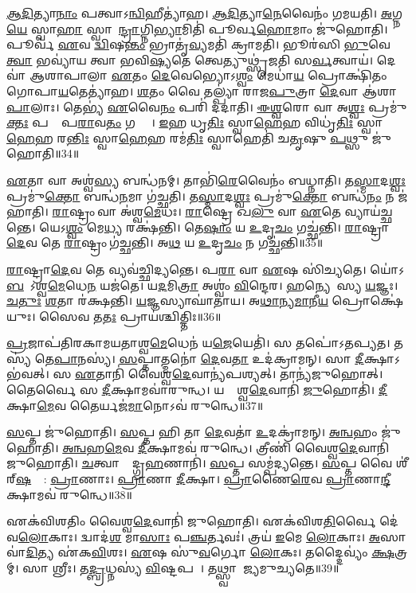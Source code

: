 \ul{𑌆}\ul{𑌦𑌿}𑌤𑍍𑌯𑌾\ul{𑌨𑌾𑌂} 𑌪𑌤𑍍𑌵𑌾\-𑌽\ul{𑌨𑍍𑌵𑌿}𑌹𑍀𑌤𑍍𑌯𑌾॑𑌹।
\ul{𑌆}\ul{𑌦𑌿}𑌤𑍍𑌯𑌾\ul{𑌨𑍇}𑌵𑍈𑌨𑌂॑ 𑌗𑌮𑌯𑌤𑌿।
\ul{𑌅}𑌗𑍍𑌨\ul{𑌯𑍇} 𑌸𑍍𑌵𑌾\ul{𑌹𑌾} 𑌸𑍍𑌵𑌾𑌹𑍇᳚\ul{𑌨𑍍𑌦𑍍𑌰𑌾}𑌗𑍍𑌨𑌿\ul{𑌭𑍍𑌯𑌾}𑌮𑌿𑌤𑌿॑ 𑌪𑍂𑌰𑍍𑌵\ul{𑌹𑍋}𑌮𑌾𑌂 𑌜𑍁॑𑌹𑍋𑌤𑌿।
𑌪𑍂𑌰𑍍𑌵॑ \ul{𑌏}𑌵 \ul{𑌦𑍍𑌵𑌿}𑌷\ul{𑌨𑍍𑌤𑌂} 𑌭𑍍𑌰𑌾𑌤𑍃॑\ul{𑌵𑍍𑌯}𑌮𑌤𑌿॑ 𑌕𑍍𑌰𑌾𑌮𑌤𑌿।
𑌭𑍂𑌰॑𑌸𑌿 \ul{𑌭𑍁}𑌵𑍇 \ul{𑌤𑍍𑌵𑌾} 𑌭𑌵𑍍𑌯𑌾॑𑌯 𑌤𑍍𑌵𑌾 𑌭𑌵𑌿\ul{𑌷𑍍𑌯}𑌤𑍇 𑌤𑍍𑌵𑍇𑌤𑍍𑌯𑍁𑌥𑍍𑌸𑍃॑𑌜𑌤𑌿 𑌸\ul{𑌰𑍍𑌵}𑌤𑍍𑌵𑌾𑌯॑।
𑌦𑍇𑌵𑌾॑ 𑌆𑌶𑌾𑌪𑌾𑌲𑌾 \ul{𑌏}𑌤𑌂 \ul{𑌦𑍇}𑌵𑍇𑌭𑍍𑌯𑍋\-𑌽\ul{𑌶𑍍𑌵𑌂} 𑌮𑍇𑌧𑌾॑\ul{𑌯} 𑌪𑍍𑌰𑍋𑌕𑍍𑌷𑌿॑𑌤𑌂 𑌗𑍋𑌪𑌾\ul{𑌯}𑌤𑍇𑌤𑍍𑌯𑌾॑𑌹।
\ul{𑌶}𑌤𑌂 𑌵𑍈 𑌤𑌲𑍍𑌪𑍍𑌯𑌾॑ 𑌰𑌾𑌜\ul{𑌪𑍁}𑌤𑍍𑌰𑌾 \ul{𑌦𑍇}𑌵𑌾 𑌆॑𑌶𑌾\ul{𑌪𑌾}𑌲𑌾𑌃।
𑌤𑍇𑌭𑍍𑌯॑ \ul{𑌏}𑌵𑍈\ul{𑌨𑌂} 𑌪𑌰𑌿॑ 𑌦𑌦𑌾𑌤𑌿।
\ul{𑌈}\ul{𑌶𑍍𑌵}𑌰𑍋 𑌵𑌾 𑌅\ul{𑌶𑍍𑌵𑌃} 𑌪𑍍𑌰𑌮𑍁॑\ul{𑌕𑍍𑌤𑌃} 𑌪𑌰𑌾𑌂᳚ 𑌪\ul{𑌰𑌾}𑌵\ul{𑌤𑌂} 𑌗𑌨𑍍𑌤𑍋𑌃᳚।
\ul{𑌇}𑌹 𑌧𑍃\ul{𑌤𑌿𑌃} 𑌸𑍍𑌵𑌾\ul{𑌹𑍇}𑌹 𑌵𑌿𑌧𑍃॑\ul{𑌤𑌿𑌃} 𑌸𑍍𑌵𑌾\ul{𑌹𑍇}𑌹 𑌰\ul{𑌨𑍍𑌤𑌿𑌃} 𑌸𑍍𑌵𑌾\ul{𑌹𑍇}𑌹 𑌰𑌮॑\ul{𑌤𑌿𑌃} 𑌸𑍍𑌵𑌾𑌹𑍇𑌤𑌿॑ 𑌚\ul{𑌤𑍃}𑌷𑍁 \ul{𑌪}𑌥𑍍𑌸𑍁 𑌜𑍁॑𑌹𑍋𑌤𑌿॥34॥

\ul{𑌏}𑌤𑌾 𑌵𑌾 𑌅𑌶𑍍𑌵॑\ul{𑌸𑍍𑌯} 𑌬𑌨𑍍𑌧॑𑌨𑌮𑍍।
𑌤𑌾𑌭𑌿॑\ul{𑌰𑍇}𑌵𑍈𑌨𑌂॑ 𑌬𑌧𑍍𑌨𑌾𑌤𑌿।
𑌤\ul{𑌸𑍍𑌮𑌾}𑌦\ul{𑌶𑍍𑌵𑌃} 𑌪𑍍𑌰𑌮𑍁॑\ul{𑌕𑍍𑌤𑍋} 𑌬𑌨𑍍𑌧॑\ul{𑌨}𑌮𑌾 𑌗॑𑌚𑍍𑌛𑌤𑌿।
𑌤\ul{𑌸𑍍𑌮𑌾}𑌦\ul{𑌶𑍍𑌵𑌃} 𑌪𑍍𑌰𑌮𑍁॑\ul{𑌕𑍍𑌤𑍋} 𑌬𑌨𑍍𑌧॑\ul{𑌨𑌂} 𑌨 𑌜॑𑌹𑌾𑌤𑌿।
\ul{𑌰𑌾}𑌷𑍍𑌟𑍍𑌰𑌂 𑌵𑌾 𑌅॑𑌶𑍍𑌵\ul{𑌮𑍇}𑌧𑌃।
\ul{𑌰𑌾}𑌷𑍍𑌟𑍍𑌰𑍇 𑌖\ul{𑌲𑍁} 𑌵𑌾 \ul{𑌏}𑌤𑍇 𑌵𑍍𑌯𑌾𑌯॑𑌚𑍍𑌛𑌨𑍍𑌤𑍇।
𑌯𑍇𑌽\ul{𑌶𑍍𑌵𑌂} 𑌮𑍇\ul{𑌧𑍍𑌯}\ul{} 𑌰𑌕𑍍𑌷॑𑌨𑍍𑌤𑌿।
𑌤𑍇\ul{𑌷𑌾𑌂} 𑌯 \ul{𑌉}𑌦𑍃\ul{𑌚𑌂} 𑌗𑌚𑍍𑌛॑𑌨𑍍𑌤𑌿।
\ul{𑌰𑌾}𑌷𑍍𑌟𑍍𑌰𑌾\ul{𑌦𑍇}𑌵 𑌤𑍇 \ul{𑌰𑌾}𑌷𑍍𑌟𑍍𑌰𑌂 𑌗॑𑌚𑍍𑌛𑌨𑍍𑌤𑌿।
𑌅\ul{𑌥} 𑌯 \ul{𑌉}𑌦𑍃\ul{𑌚𑌂} 𑌨 𑌗𑌚𑍍𑌛॑𑌨𑍍𑌤𑌿॥35॥

\ul{𑌰𑌾}𑌷𑍍𑌟𑍍𑌰𑌾\ul{𑌦𑍇}𑌵 𑌤𑍇 𑌵𑍍𑌯𑌵॑𑌚𑍍𑌛𑌿𑌦𑍍𑌯𑌨𑍍𑌤𑍇।
𑌪\ul{𑌰𑌾} 𑌵𑌾 \ul{𑌏}𑌷 𑌸𑌿॑𑌚𑍍𑌯𑌤𑍇।
𑌯𑍋॑𑌽\ul{𑌬}𑌲𑍋᳚\-𑌽𑌶𑍍𑌵\ul{𑌮𑍇}𑌧𑍇\ul{𑌨} 𑌯𑌜॑𑌤𑍇।
𑌯\ul{𑌦}𑌮𑌿\ul{𑌤𑍍𑌰𑌾} 𑌅𑌶𑍍𑌵𑌂॑ \ul{𑌵𑌿}𑌨𑍍𑌦𑍇𑌰\sn{}।
\ul{𑌹}𑌨𑍍𑌯𑍇𑌤𑌾᳚𑌸𑍍𑌯 \ul{𑌯}𑌜𑍍𑌞𑌃।
\ul{𑌚}\ul{𑌤𑍁𑌃} \ul{𑌶}𑌤𑌾 𑌰॑𑌕𑍍𑌷𑌨𑍍𑌤𑌿।
\ul{𑌯}𑌜𑍍𑌞𑌸𑍍𑌯𑌾𑌘𑌾॑𑌤𑌾𑌯।
𑌅\ul{𑌥𑌾}𑌨𑍍𑌯\ul{𑌮𑌾}𑌨𑍀\ul{𑌯} 𑌪𑍍𑌰𑍋𑌕𑍍𑌷𑍇॑𑌯𑍁𑌃।
𑌸𑍈𑌵 𑌤\ul{𑌤𑌃} 𑌪𑍍𑌰𑌾𑌯॑𑌶𑍍𑌚𑌿𑌤𑍍𑌤𑌿𑌃॥36॥\anuvakamend[\ul{𑌗}\ul{𑌚𑍍𑌛}\ul{𑌤𑌿} \ul{𑌭}\ul{𑌵}\ul{𑌤𑌃} \ul{𑌪}𑌥𑍍𑌸𑍁 𑌜𑍁॑𑌹𑍋\ul{𑌤𑌿} 𑌨 𑌗𑌚𑍍𑌛॑\ul{𑌨𑍍𑌤𑌿} 𑌨𑌵॑ 𑌚]

\ul{𑌪𑍍𑌰}𑌜𑌾𑌪॑𑌤𑌿𑌰𑌕𑌾𑌮𑌯𑌤𑌾𑌶𑍍𑌵\ul{𑌮𑍇}𑌧𑍇𑌨॑ 𑌯\ul{𑌜𑍇}𑌯𑍇𑌤𑌿॑।
𑌸 𑌤𑌪𑍋॑\-𑌽𑌤𑌪𑍍𑌯𑌤।
𑌤𑌸𑍍𑌯॑ 𑌤𑍇\ul{𑌪𑌾}𑌨𑌸𑍍𑌯॑।
\ul{𑌸}𑌪𑍍𑌤𑌾𑌤𑍍𑌮𑌨𑍋॑ \ul{𑌦𑍇}𑌵\ul{𑌤𑌾} 𑌉𑌦॑𑌕𑍍𑌰𑌾𑌮𑌨𑍍।
𑌸𑌾 \ul{𑌦𑍀}𑌕𑍍𑌷𑌾\-𑌽𑌭॑𑌵𑌤𑍍।
𑌸 \ul{𑌏}𑌤𑌾𑌨𑌿॑ 𑌵𑍈𑌶𑍍𑌵\ul{𑌦𑍇}𑌵𑌾𑌨𑍍𑌯॑𑌪𑌶𑍍𑌯𑌤𑍍।
𑌤𑌾𑌨𑍍𑌯॑𑌜𑍁𑌹𑍋𑌤𑍍।
𑌤𑍈𑌰𑍍𑌵𑍈 𑌸 \ul{𑌦𑍀}𑌕𑍍𑌷𑌾𑌮𑌵𑌾॑𑌰𑍁𑌨𑍍𑌧।
𑌯𑌦𑍍𑌵𑍈᳚𑌶𑍍𑌵\ul{𑌦𑍇}𑌵𑌾𑌨𑌿॑ \ul{𑌜𑍁}𑌹𑍋𑌤𑌿॑।
\ul{𑌦𑍀}𑌕𑍍𑌷𑌾\ul{𑌮𑍇}𑌵 𑌤𑍈𑌰𑍍𑌯𑌜॑\ul{𑌮𑌾}𑌨𑍋𑌽𑌵॑ 𑌰𑍁𑌨𑍍𑌧𑍇॥37॥

\ul{𑌸}𑌪𑍍𑌤 𑌜𑍁॑𑌹𑍋𑌤𑌿।
\ul{𑌸}𑌪𑍍𑌤 𑌹𑌿 𑌤𑌾 \ul{𑌦𑍇}𑌵𑌤𑌾॑ \ul{𑌉}𑌦𑌕𑍍𑌰𑌾॑𑌮𑌨𑍍।
\ul{𑌅}\ul{𑌨𑍍𑌵}𑌹𑌂 𑌜𑍁॑𑌹𑍋𑌤𑌿।
\ul{𑌅}\ul{𑌨𑍍𑌵}𑌹\ul{𑌮𑍇}𑌵 \ul{𑌦𑍀}𑌕𑍍𑌷𑌾𑌮𑌵॑ 𑌰𑍁𑌨𑍍𑌧𑍇।
𑌤𑍍𑌰𑍀𑌣𑌿॑ 𑌵𑍈𑌶𑍍𑌵\ul{𑌦𑍇}𑌵𑌾𑌨𑌿॑ 𑌜𑍁𑌹𑍋𑌤𑌿।
\ul{𑌚}𑌤𑍍𑌵𑌾𑌰𑍍𑌯𑍗᳚𑌦𑍍𑌗𑍍𑌰\ul{𑌹}𑌣𑌾𑌨𑌿॑।
\ul{𑌸}𑌪𑍍𑌤 𑌸𑌮𑍍𑌪॑𑌦𑍍𑌯𑌨𑍍𑌤𑍇।
\ul{𑌸}𑌪𑍍𑌤 𑌵𑍈 𑌶𑍀॑𑌰𑍍‌\mbox{}\ul{𑌷}𑌣𑍍𑌯𑌾᳚: \ul{𑌪𑍍𑌰𑌾}𑌣𑌾𑌃।
\ul{𑌪𑍍𑌰𑌾}𑌣𑌾 \ul{𑌦𑍀}𑌕𑍍𑌷𑌾।
\ul{𑌪𑍍𑌰𑌾}𑌣𑍈\ul{𑌰𑍇}𑌵 \ul{𑌪𑍍𑌰𑌾}𑌣𑌾\ul{𑌨𑍍𑌦𑍀}𑌕𑍍𑌷𑌾𑌮𑌵॑ 𑌰𑍁𑌨𑍍𑌧𑍇॥38॥

𑌏𑌕॑𑌵𑌿𑌶𑌤𑌿𑌂 𑌵𑍈𑌶𑍍𑌵\ul{𑌦𑍇}𑌵𑌾𑌨𑌿॑ 𑌜𑍁𑌹𑍋𑌤𑌿।
𑌏𑌕॑𑌵𑌿𑌶\ul{𑌤𑌿}𑌰𑍍𑌵𑍈 𑌦𑍇॑𑌵\ul{𑌲𑍋}𑌕𑌾𑌃।
𑌦𑍍𑌵𑌾𑌦॑\ul{𑌶} 𑌮𑌾\ul{𑌸𑌾𑌃} 𑌪\ul{𑌞𑍍𑌚}𑌰𑍍𑌤𑌵𑌃॑।
𑌤𑍍𑌰𑌯॑ \ul{𑌇}𑌮𑍇 \ul{𑌲𑍋}𑌕𑌾𑌃।
\ul{𑌅}𑌸𑌾𑌵𑌾॑\ul{𑌦𑌿}𑌤𑍍𑌯 𑌏॑𑌕\ul{𑌵𑌿}\ul{}𑌶𑌃।
\ul{𑌏}𑌷 𑌸𑍁॑\ul{𑌵}𑌰𑍍𑌗𑍋 \ul{𑌲𑍋}𑌕𑌃।
𑌤𑌦𑍍𑌦𑍈𑌵𑍍𑌯𑌂॑ \ul{𑌕𑍍𑌷}𑌤𑍍𑌰𑌮𑍍।
𑌸𑌾 𑌶𑍍𑌰𑍀𑌃।
𑌤\ul{𑌦𑍍𑌬𑍍𑌰}𑌧𑍍𑌨𑌸𑍍𑌯॑ \ul{𑌵𑌿}𑌷𑍍𑌟𑌪𑌮𑍍᳚।
𑌤𑌥𑍍𑌸𑍍𑌵𑌾𑌰𑌾᳚𑌜𑍍𑌯𑌮𑍁𑌚𑍍𑌯𑌤𑍇॥39॥

